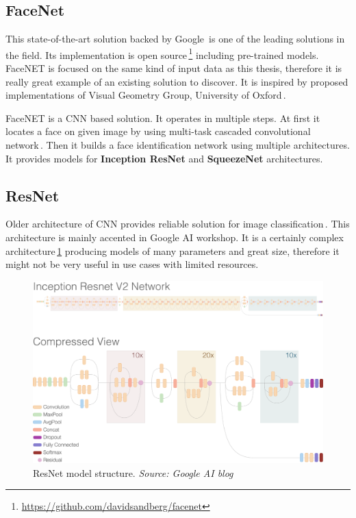 \subsection{FaceNet}
\label{ss:facenet}

This state-of-the-art solution backed by Google\,\cite{facenet} is one of the leading solutions in the field. Its implementation is open source\,\footnote{\url{https://github.com/davidsandberg/facenet}} including pre-trained models. FaceNET is focused on the same kind of input data as this thesis, therefore it is really great example of an existing solution to discover. It is inspired by proposed implementations of Visual Geometry Group, University of Oxford\,\cite{vgg_face_reco}.

FaceNET is a CNN based solution. It operates in multiple steps. At first it locates a face on given image by using multi-task cascaded convolutional network\,\cite{mtcnn}. Then it builds a face identification network using multiple architectures. It provides models for \textbf{Inception ResNet} and \textbf{SqueezeNet} architectures.

\subsection{ResNet}

Older architecture of CNN provides reliable solution for image classification\,\cite{resnet}. This architecture is mainly accented in Google AI workshop. It is a certainly complex architecture\,\ref{fig:resnet} producing models of many parameters and great size, therefore it might not be very useful in use cases with limited resources.

\begin{figure}[ht]
    \centering
    \includegraphics[width=.8\textwidth]{obrazky-figures/resnet.png}
    \caption[ResNet model structure]{ResNet model structure. \textit{Source: Google AI blog\,\footnotemark}}
    \label{fig:resnet}
\end{figure}

